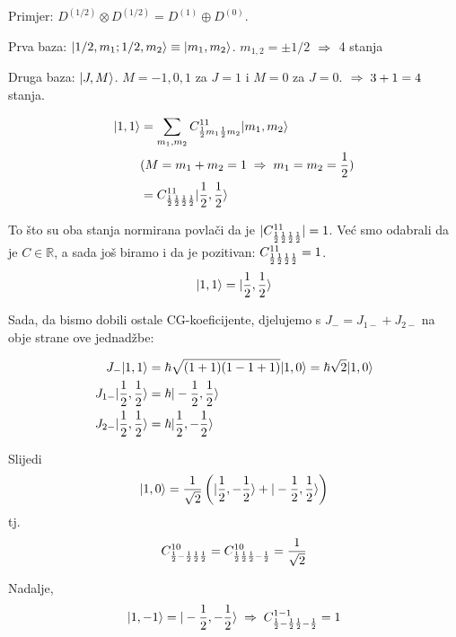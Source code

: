 Primjer: 
 $D^{(1/2)}\otimes D^{(1/2)} = D^{(1)} \oplus D^{(0)}$.

Prva baza: $| 1/2, m_1; 1/2, m_2 \rangle\equiv| m_1, m_2 \rangle$.
$m_{1,2}=\pm 1/2$ $\;\Rightarrow\;$ 4 stanja

Druga baza: $| J, M \rangle$. $M=-1, 0, 1$ za $J=1$ i $M=0$ za $J=0$.
$\;\Rightarrow\; 3+1=4$ stanja.

\begin{equation*}
\begin{split}
 | 1,1 \rangle &= \sum_{m_1, m_2}C^{1 1}_{\frac{1}{2} m_1 \frac{1}{2} m_2}| m_1, m_2 \rangle\\
& (M=m_1+m_2=1 \;\Rightarrow\; m_1=m_2=\frac{1}{2} )\\
&= C^{1 1}_{\frac{1}{2} \frac{1}{2} \frac{1}{2} \frac{1}{2}}| \frac{1}{2}, \frac{1}{2} \rangle
\end{split}
\end{equation*}

To što su oba stanja normirana povlači da je $|C^{1 1}_{\frac{1}{2} \frac{1}{2}
\frac{1}{2} \frac{1}{2}}|=1$. Već smo odabrali da je $C\in\mathbb{R}$, a sada
još biramo i da je pozitivan: 
$C^{1 1}_{\frac{1}{2} \frac{1}{2} \frac{1}{2} \frac{1}{2}}=1$.
\begin{displaymath}
    | 1, 1 \rangle = | \frac{1}{2}, \frac{1}{2} \rangle
\end{displaymath}

Sada, da bismo dobili ostale CG-koeficijente,
djelujemo s $J_- = J_{1-}+J_{2-}$ na obje strane ove jednadžbe:

\begin{align*}
J_- | 1, 1 \rangle&=\hbar \sqrt{(1+1)(1-1+1)} | 1,0 \rangle =\hbar\sqrt{2}| 1, 0 \rangle\\
J_{1-} | \frac{1}{2}, \frac{1}{2} \rangle&=\hbar| -\frac{1}{2}, \frac{1}{2} \rangle\\
J_{2-} | \frac{1}{2}, \frac{1}{2} \rangle&=\hbar| \frac{1}{2}, -\frac{1}{2} \rangle\\
\end{align*}

Slijedi
\begin{displaymath}
 | 1, 0 \rangle = \frac{1}{\sqrt{2}}\left(| \frac{1}{2}, -\frac{1}{2} \rangle+
| -\frac{1}{2}, \frac{1}{2} \rangle\right)
\end{displaymath}
tj.
\begin{displaymath}
C^{1 0}_{\frac{1}{2} -\frac{1}{2} \frac{1}{2} \frac{1}{2}}=
C^{1 0}_{\frac{1}{2}  \frac{1}{2} \frac{1}{2} -\frac{1}{2}} = \frac{1}{\sqrt{2}}
\end{displaymath}

Nadalje,
\begin{displaymath}
    | 1, -1 \rangle = | -\frac{1}{2}, -\frac{1}{2} \rangle \;\Rightarrow\;
C^{1 -1}_{\frac{1}{2} -\frac{1}{2} \frac{1}{2} -\frac{1}{2}}= 1
    \end{displaymath}

